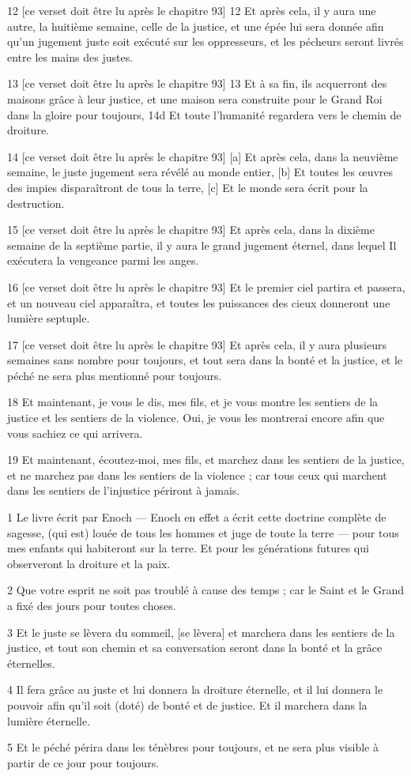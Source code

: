 \par 12 [ce verset doit être lu après le chapitre 93] 12 Et après cela, il y aura une autre, la huitième semaine, celle de la justice, et une épée lui sera donnée afin qu'un jugement juste soit exécuté sur les oppresseurs, et les pécheurs seront livrés entre les mains des justes.
\par 13 [ce verset doit être lu après le chapitre 93] 13 Et à sa fin, ils acquerront des maisons grâce à leur justice, et une maison sera construite pour le Grand Roi dans la gloire pour toujours, 14d Et toute l'humanité regardera vers le chemin de droiture.
\par 14 [ce verset doit être lu après le chapitre 93] [a] Et après cela, dans la neuvième semaine, le juste jugement sera révélé au monde entier, [b] Et toutes les œuvres des impies disparaîtront de tous la terre, [c] Et le monde sera écrit pour la destruction.
\par 15 [ce verset doit être lu après le chapitre 93] Et après cela, dans la dixième semaine de la septième partie, il y aura le grand jugement éternel, dans lequel Il exécutera la vengeance parmi les anges.
\par 16 [ce verset doit être lu après le chapitre 93] Et le premier ciel partira et passera, et un nouveau ciel apparaîtra, et toutes les puissances des cieux donneront une lumière septuple.
\par 17 [ce verset doit être lu après le chapitre 93] Et après cela, il y aura plusieurs semaines sans nombre pour toujours, et tout sera dans la bonté et la justice, et le péché ne sera plus mentionné pour toujours.
\par 18 Et maintenant, je vous le dis, mes fils, et je vous montre les sentiers de la justice et les sentiers de la violence. Oui, je vous les montrerai encore afin que vous sachiez ce qui arrivera.
\par 19 Et maintenant, écoutez-moi, mes fils, et marchez dans les sentiers de la justice, et ne marchez pas dans les sentiers de la violence ; car tous ceux qui marchent dans les sentiers de l’injustice périront à jamais.


\par 1 Le livre écrit par Enoch — Enoch en effet a écrit cette doctrine complète de sagesse, (qui est) louée de tous les hommes et juge de toute la terre — pour tous mes enfants qui habiteront sur la terre. Et pour les générations futures qui observeront la droiture et la paix.
\par 2 Que votre esprit ne soit pas troublé à cause des temps ; car le Saint et le Grand a fixé des jours pour toutes choses.
\par 3 Et le juste se lèvera du sommeil, [se lèvera] et marchera dans les sentiers de la justice, et tout son chemin et sa conversation seront dans la bonté et la grâce éternelles.
\par 4 Il fera grâce au juste et lui donnera la droiture éternelle, et il lui donnera le pouvoir afin qu'il soit (doté) de bonté et de justice. Et il marchera dans la lumière éternelle.
\par 5 Et le péché périra dans les ténèbres pour toujours, et ne sera plus visible à partir de ce jour pour toujours.

